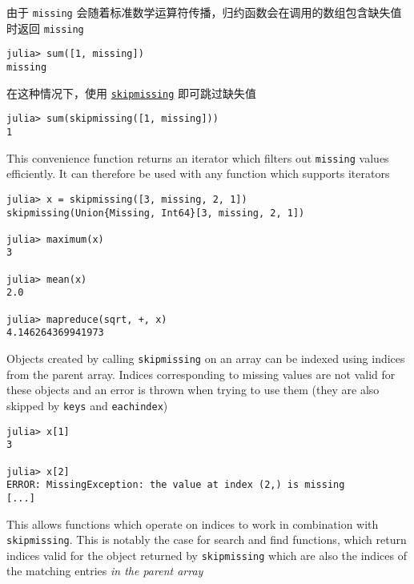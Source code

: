 由于 \texttt{missing} 会随着标准数学运算符传播，归约函数会在调用的数组包含缺失值时返回 \texttt{missing}




\begin{verbatim}
julia> sum([1, missing])
missing
\end{verbatim}



在这种情况下，使用 \hyperlink{2012470681884771400}{\texttt{skipmissing}} 即可跳过缺失值




\begin{verbatim}
julia> sum(skipmissing([1, missing]))
1
\end{verbatim}



This convenience function returns an iterator which filters out \texttt{missing} values efficiently. It can therefore be used with any function which supports iterators




\begin{verbatim}
julia> x = skipmissing([3, missing, 2, 1])
skipmissing(Union{Missing, Int64}[3, missing, 2, 1])

julia> maximum(x)
3

julia> mean(x)
2.0

julia> mapreduce(sqrt, +, x)
4.146264369941973
\end{verbatim}



Objects created by calling \texttt{skipmissing} on an array can be indexed using indices from the parent array. Indices corresponding to missing values are not valid for these objects and an error is thrown when trying to use them (they are also skipped by \texttt{keys} and \texttt{eachindex})




\begin{verbatim}
julia> x[1]
3

julia> x[2]
ERROR: MissingException: the value at index (2,) is missing
[...]
\end{verbatim}



This allows functions which operate on indices to work in combination with \texttt{skipmissing}. This is notably the case for search and find functions, which return indices valid for the object returned by \texttt{skipmissing} which are also the indices of the matching entries \emph{in the parent array}




